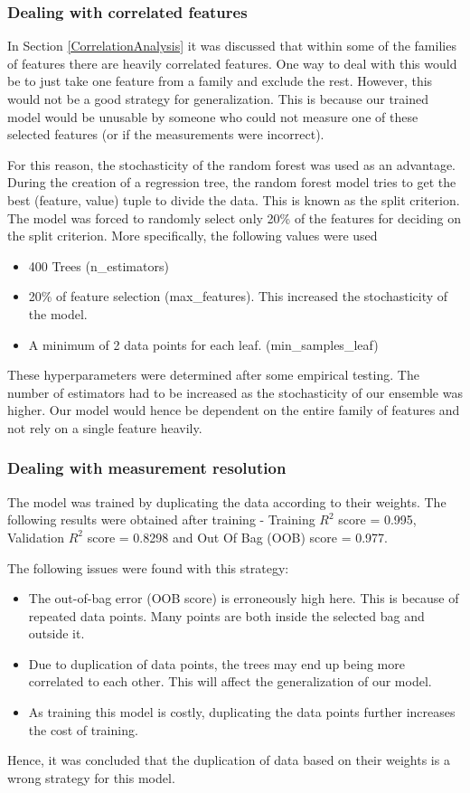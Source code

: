\documentclass[11pt]{article}
\begin{document}
\subsubsection{Dealing with correlated features}
In Section \ref{CorrelationAnalysis} it was discussed that within some of the families of features there are heavily correlated features.
One way to deal with this would be to just take one feature from a family and exclude the rest.
However, this would not be a good strategy for generalization.
This is because our trained model would be unusable by someone who could not measure one of these selected features (or if the measurements were incorrect).

For this reason, the stochasticity of the random forest was used as an advantage.
During the creation of a regression tree,  the random forest model tries to get the best (feature,  value) tuple to divide the data. This is known as the split criterion.
The model was forced to randomly select only 20\% of the features for deciding on the split criterion.
More specifically, the following values were used
\begin{itemize}
\item 400 Trees (n\_estimators)
\item 20\% of feature selection (max\_features). This increased the stochasticity of the model.
\item A minimum of 2 data points for each leaf.  (min\_samples\_leaf)
\end{itemize}
These hyperparameters were determined after some empirical testing.
The number of estimators had to be increased as the stochasticity of our ensemble was higher.
Our model would hence be dependent on the entire family of features and not rely on a single feature heavily.


\subsubsection{Dealing with measurement resolution}

The model was trained by duplicating the data according to their weights. 
The following results were obtained after training - Training $R^2$ score = 0.995,  Validation $R^2$ score = 0.8298 and  Out Of Bag (OOB) score = 0.977.

The following issues were found with this strategy:
\begin{itemize}
\item The out-of-bag error (OOB score) is erroneously high here. This is because of repeated data points. Many points are both inside the selected bag and outside it.
\item Due to duplication of data points,  the trees may end up being more correlated to each other.  This will affect the generalization of our model.
\item As training this model is costly, duplicating the data points further increases the cost of training.
\end{itemize}
Hence, it was concluded that the duplication of data based on their weights is a wrong strategy for this model.
\end{document}
